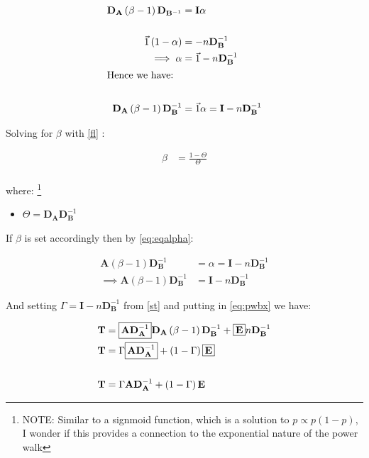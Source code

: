 \documentclass[11pt]{article}
\begin{document}
\begin{align}
\mathbf{D}_{\mathbf{A}}   \left( \beta -  1 \right)\mathbf{D}_{\mathbf{B}^{- 1}} &=\mathbf{I}  \alpha \label{fl} \\
    \ \nonumber \\
  \vec{1}  \left( 1- \alpha \right) &=  - n \mathbf{D}_{\mathbf{B}}^{- 1}  \nonumber \\
    \implies  \alpha &=  \vec{1}- n \mathbf{D}_{\mathbf{B}}^{- 1} \label{st} \\
    \intertext{Hence we have:} \notag \\
\mathbf{D}_{\mathbf{A}}  \left( \beta -  1 \right)\mathbf{D}_{\mathbf{B}}^{- 1} &= \vec{1} \alpha =  \mathbf{I}- n \mathbf{D}_{\mathbf{B}}^{- 1} \label{eq:eqalpha}
\end{align}


Solving for \(\beta\)  with \eqref{fl} :

\begin{align}
    \beta&= \frac{1- \Theta}{\Theta}\\
\end{align}

where: \footnote{NOTE: Similar to a signmoid function, which is a solution to \(p \propto p(1-p)\), I wonder if this provides a connection to the exponential nature of the power walk}
\begin{itemize}
\item \(\Theta = \mathbf{D}_{\mathbf{A}} \mathbf{D}_{\mathbf{B}}^{- 1}\)
\end{itemize}


If \(\beta\) is set accordingly then by \eqref{eq:eqalpha}:

\begin{align}
    \mathbf{A}\left( \beta- 1 \right) \mathbf{D}_{\mathbf{B}}^{- 1} &= \alpha = \mathbf{I}- n \mathbf{D}_{\mathbf{B}}^{- 1} \nonumber \\
     \implies  \mathbf{A}\left( \beta- 1 \right) \mathbf{D}_{\mathbf{B}}^{- 1} &=  \mathbf{I}- n \mathbf{D}_{\mathbf{B}}^{- 1}
\end{align}

And setting \(\Gamma = \mathbf{I}- n \mathbf{D}_{\mathbf{B}}^{- 1}\)  from \eqref{st} and putting in \eqref{eq:pwbx} we have:

\begin{align}
\mathbf{T} &= \text{\fboxsep=.2em\fbox{$\mathbf{A}\mathbf{D}_{\mathbf{A}}^{- 1}$}}  \mathbf{D}_{\mathbf{A}} \left( \beta - 1 \right) \mathbf{D}_{\mathbf{B}}^{- 1} + \text{\fboxsep=.2em\fbox{$\mathbf{E}$}} n \mathbf{D}_{\mathbf{B}}^{- 1}  \nonumber \\
  \mathbf{T} &= \Gamma \text{\fboxsep=.2em\fbox{$\mathbf{A}\mathbf{D}_{\mathbf{A}}^{- 1}$}}  + \left( 1-\Gamma \right) \text{\fboxsep=.2em\fbox{$\mathbf{E}$}} \nonumber \\
  \ \nonumber \\
  \mathbf{T} &= \Gamma \mathbf{A}\mathbf{D}_{\mathbf{A}}^{- 1}  + \left( 1-\Gamma \right) \mathbf{E}
  \end{align}
\end{document}
